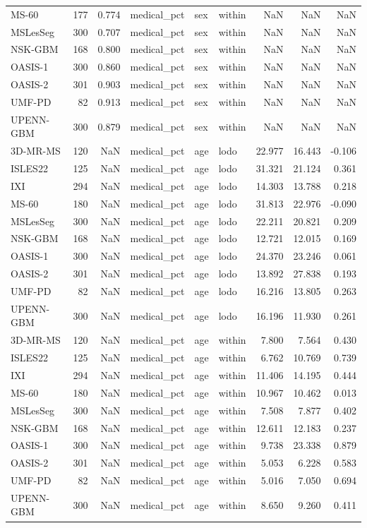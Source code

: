 \begin{tabular}{lrrlllrrr}
MS-60 & 177 & 0.774 & medical\_pct & sex & within & NaN & NaN & NaN \\
MSLesSeg & 300 & 0.707 & medical\_pct & sex & within & NaN & NaN & NaN \\
NSK-GBM & 168 & 0.800 & medical\_pct & sex & within & NaN & NaN & NaN \\
OASIS-1 & 300 & 0.860 & medical\_pct & sex & within & NaN & NaN & NaN \\
OASIS-2 & 301 & 0.903 & medical\_pct & sex & within & NaN & NaN & NaN \\
UMF-PD & 82 & 0.913 & medical\_pct & sex & within & NaN & NaN & NaN \\
UPENN-GBM & 300 & 0.879 & medical\_pct & sex & within & NaN & NaN & NaN \\
3D-MR-MS & 120 & NaN & medical\_pct & age & lodo & 22.977 & 16.443 & -0.106 \\
ISLES22 & 125 & NaN & medical\_pct & age & lodo & 31.321 & 21.124 & 0.361 \\
IXI & 294 & NaN & medical\_pct & age & lodo & 14.303 & 13.788 & 0.218 \\
MS-60 & 180 & NaN & medical\_pct & age & lodo & 31.813 & 22.976 & -0.090 \\
MSLesSeg & 300 & NaN & medical\_pct & age & lodo & 22.211 & 20.821 & 0.209 \\
NSK-GBM & 168 & NaN & medical\_pct & age & lodo & 12.721 & 12.015 & 0.169 \\
OASIS-1 & 300 & NaN & medical\_pct & age & lodo & 24.370 & 23.246 & 0.061 \\
OASIS-2 & 301 & NaN & medical\_pct & age & lodo & 13.892 & 27.838 & 0.193 \\
UMF-PD & 82 & NaN & medical\_pct & age & lodo & 16.216 & 13.805 & 0.263 \\
UPENN-GBM & 300 & NaN & medical\_pct & age & lodo & 16.196 & 11.930 & 0.261 \\
3D-MR-MS & 120 & NaN & medical\_pct & age & within & 7.800 & 7.564 & 0.430 \\
ISLES22 & 125 & NaN & medical\_pct & age & within & 6.762 & 10.769 & 0.739 \\
IXI & 294 & NaN & medical\_pct & age & within & 11.406 & 14.195 & 0.444 \\
MS-60 & 180 & NaN & medical\_pct & age & within & 10.967 & 10.462 & 0.013 \\
MSLesSeg & 300 & NaN & medical\_pct & age & within & 7.508 & 7.877 & 0.402 \\
NSK-GBM & 168 & NaN & medical\_pct & age & within & 12.611 & 12.183 & 0.237 \\
OASIS-1 & 300 & NaN & medical\_pct & age & within & 9.738 & 23.338 & 0.879 \\
OASIS-2 & 301 & NaN & medical\_pct & age & within & 5.053 & 6.228 & 0.583 \\
UMF-PD & 82 & NaN & medical\_pct & age & within & 5.016 & 7.050 & 0.694 \\
UPENN-GBM & 300 & NaN & medical\_pct & age & within & 8.650 & 9.260 & 0.411 \\
\bottomrule
\end{tabular}
